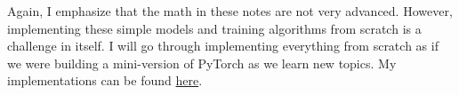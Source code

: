 Again, I emphasize that the math in these notes are not very advanced. However, implementing these simple models and training algorithms from scratch is a challenge in itself. I will go through implementing everything from scratch as if we were building a mini-version of PyTorch as we learn new topics. My implementations can be found \href{https://github.com/mbahng/pyember}{here}. 
